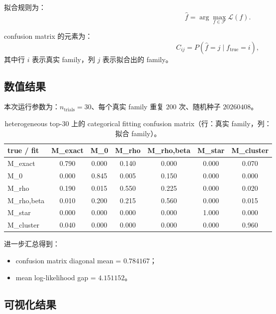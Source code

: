 拟合规则为：
\begin{equation}
\hat f=\arg\max_{f\in\mathcal F}\mathcal L(f).
\end{equation}

confusion matrix 的元素为：
\begin{equation}
C_{ij}=P(\hat f=j\mid f_{\text{true}}=i),
\end{equation}
其中行 \(i\) 表示真实 family，列 \(j\) 表示拟合出的 family。

\subsection{数值结果}

本次运行参数为：\(n_{\text{trials}}=30\)、每个真实 family 重复 \(200\) 次、随机种子 \(20260408\)。

\begin{table}[h]
\centering
\small
\begin{tabular}{lcccccc}
\toprule
true / fit & M\_exact & M\_0 & M\_rho & M\_rho,beta & M\_star & M\_cluster \\
\midrule
M\_exact   & 0.790 & 0.000 & 0.140 & 0.000 & 0.000 & 0.070 \\
M\_0       & 0.000 & 0.845 & 0.005 & 0.150 & 0.000 & 0.000 \\
M\_rho     & 0.190 & 0.015 & 0.550 & 0.225 & 0.000 & 0.020 \\
M\_rho,beta& 0.010 & 0.200 & 0.215 & 0.560 & 0.000 & 0.015 \\
M\_star    & 0.000 & 0.000 & 0.000 & 0.000 & 1.000 & 0.000 \\
M\_cluster & 0.040 & 0.000 & 0.000 & 0.000 & 0.000 & 0.960 \\
\bottomrule
\end{tabular}
\caption{heterogeneous top-30 上的 categorical fitting confusion matrix（行：真实 family，列：拟合 family）。}
\label{tab:analysis02-confusion}
\end{table}

进一步汇总得到：
\begin{itemize}
    \item confusion matrix diagonal mean = \(0.784167\)；
    \item mean log-likelihood gap = \(4.151152\)。
\end{itemize}

\subsection{可视化结果}

